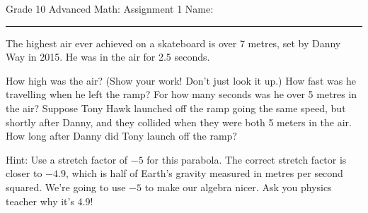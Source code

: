 \documentclass[fleqn,12pt]{article}
\begin{document}
\pagestyle{empty}
\noindent Grade 10 Advanced Math: Assignment 1 \hfill Name: \hspace{2in}
\medskip\hrule
\vspace{1em}
\noindent
The highest air ever achieved on a skateboard is over 7 metres, set by Danny Way in 2015.  He was in the air for 2.5 seconds.
\begin{tasks}
\task How high was the air?  (Show your work!  Don't just look it up.)
\task How fast was he travelling when he left the ramp?
\task For how many seconds was he over 5 metres in the air?
\task Suppose Tony Hawk launched off the ramp going the same speed, but shortly after Danny, and they collided when they were both 5 meters in the air.  How long after Danny did Tony launch off the ramp?
\end{tasks}
Hint: Use a stretch factor of $-5$ for this parabola.  The correct stretch factor is closer to $-4.9$, which is half of Earth’s gravity measured in metres per second squared.  We're going to use $-5$ to make our algebra nicer. Ask you physics teacher why it's 4.9!
\end{document}
